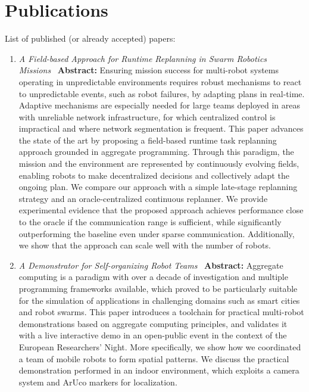 \documentclass[runningheads]{llncs}
\begin{document}
{{    \section{Publications}\label{sec:publications}
    List of published (or already accepted) papers:
    \begin{enumerate}
        \item \emph{A Field-based Approach for Runtime Replanning in Swarm Robotics Missions}~\cite{DBLP:conf/acsos/AguzziBCMPPV25}
        \textbf{Abstract:}
        Ensuring mission success for multi-robot systems operating
        in unpredictable environments requires robust mechanisms to react to unpredictable events,
            such as robot failures,
            by adapting plans in real-time.
            Adaptive mechanisms are especially needed for large teams deployed in areas with unreliable network infrastructure,
            for which centralized control is impractical and where network segmentation is frequent.
            This paper advances the state of the art by proposing a field-based runtime task replanning approach grounded in aggregate programming.
            Through this paradigm,
            the mission and the environment are represented by continuously evolving fields,
            enabling robots to make decentralized decisions
            and collectively adapt the ongoing plan.
            We compare our approach with a simple late-stage replanning strategy
            and an oracle-centralized continuous replanner.
            We provide experimental evidence that
            the proposed approach achieves performance close to the oracle if the communication range is sufficient,
            while significantly outperforming the baseline even under sparse communication.
            Additionally, we show that the approach can scale well with the number of robots.

        \item \emph{A Demonstrator for Self-organizing Robot Teams}~\cite{DBLP:conf/coordination/AguzziBBCCDFPV25}
        \textbf{Abstract:}
            Aggregate computing is a paradigm with over a decade of investigation and multiple programming frameworks available,
            which proved to be particularly suitable for the simulation of applications in challenging domains such as smart cities and robot swarms.
            This paper introduces a toolchain for practical multi-robot demonstrations based on aggregate computing principles,
            and validates it with a live interactive demo in an open-public event in the context of the European Researchers’ Night.
            More specifically,
            we show how we coordinated a team of mobile robots to form spatial patterns.
            We discuss the practical demonstration performed in an indoor environment,
            which exploits a camera system and ArUco markers for localization.
    \end{enumerate}

}}
\end{document}
